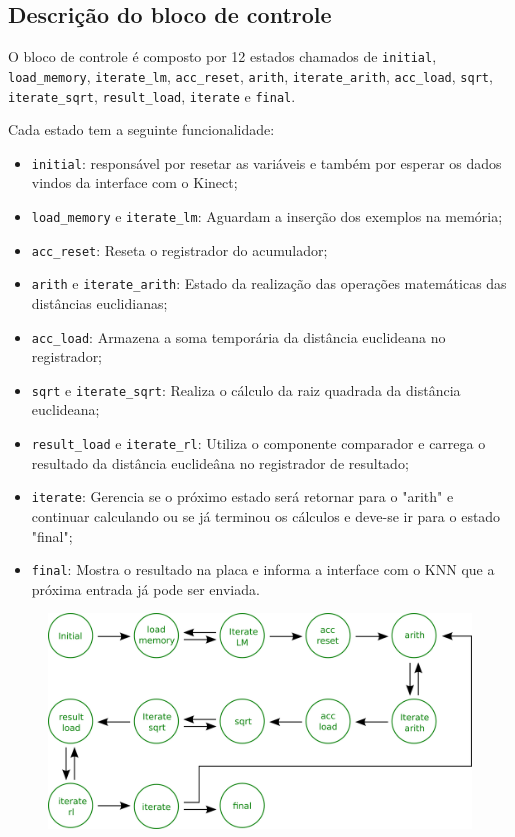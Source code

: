 \subsection{Descrição do bloco de controle}

O bloco de controle é composto por 12 estados chamados de \verb|initial|,
\verb|load_memory|, \verb|iterate_lm|, \verb|acc_reset|,
\verb|arith|, \verb|iterate_arith|, \verb|acc_load|, \verb|sqrt|,
\verb|iterate_sqrt|, \verb|result_load|, \verb|iterate| e 
\verb|final|.

Cada estado tem a seguinte funcionalidade:

\begin{itemize}
\item \verb|initial|: responsável por resetar as variáveis e também por esperar os dados vindos da interface com o Kinect;
\item \verb|load_memory| e \verb|iterate_lm|: Aguardam a inserção dos exemplos na memória;
\item \verb|acc_reset|: Reseta o registrador do acumulador;
\item \verb|arith| e \verb|iterate_arith|: Estado da realização das operações matemáticas das distâncias euclidianas;
\item \verb|acc_load|: Armazena a soma temporária da distância euclideana no registrador;
\item \verb|sqrt| e \verb|iterate_sqrt|: Realiza o cálculo da raiz quadrada da distância euclideana;
\item \verb|result_load| e \verb|iterate_rl|: Utiliza o componente comparador e carrega o resultado da distância euclideâna no registrador de resultado;
\item \verb|iterate|: Gerencia se o próximo estado será retornar para o "arith" e continuar calculando ou se já terminou os cálculos 
e deve-se ir para o estado "final";
\item \verb|final|: Mostra o resultado na placa e informa a interface com o KNN que a próxima entrada já pode ser enviada.
\end{itemize}

\begin{figure}[!ht]
\centering
\includegraphics[scale=0.2]{img/control_unit.png}
\end{figure}

